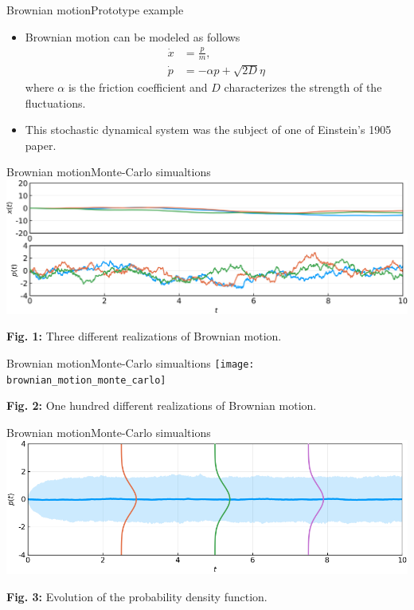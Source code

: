 \documentclass[usenames,dvipsnames,svgnames,10pt,aspectratio=169]{beamer}
\begin{document}
\begin{frame}[t, c]{Brownian motion}{Prototype example}
	\begin{itemize}
		\item Brownian motion can be modeled as follows
		$$
		\begin{aligned}
			\dot{x} & = \frac{p}{m}, \\
			\dot{p} & = -\alpha p + \sqrt{2D} \eta
		\end{aligned}
		$$
		where $\alpha$ is the friction coefficient and $D$ characterizes the strength of the fluctuations.

		\medskip

		\item This stochastic dynamical system was the subject of one of Einstein's 1905 paper.
	\end{itemize}

	\vspace{1cm}
\end{frame}

\begin{frame}[t, c]{Brownian motion}{Monte-Carlo simualtions}
	\centering
	\includegraphics[width=.8\textwidth]{brownian_motions}

	\textbf{Fig. 1:} Three different realizations of Brownian motion.

	\vspace{1cm}
\end{frame}

\begin{frame}[t, c]{Brownian motion}{Monte-Carlo simualtions}
	\centering
	\texttt{[image: brownian\_motion\_monte\_carlo]}

	\textbf{Fig. 2:} One hundred different realizations of Brownian motion.

	\vspace{1cm}
\end{frame}

\begin{frame}[t, c]{Brownian motion}{Monte-Carlo simualtions}
	\centering
	\includegraphics[width=.8\textwidth]{brownian_motion_monte_carlo_summary}

	\textbf{Fig. 3:} Evolution of the probability density function.

	\vspace{1cm}
\end{frame}
\end{document}
